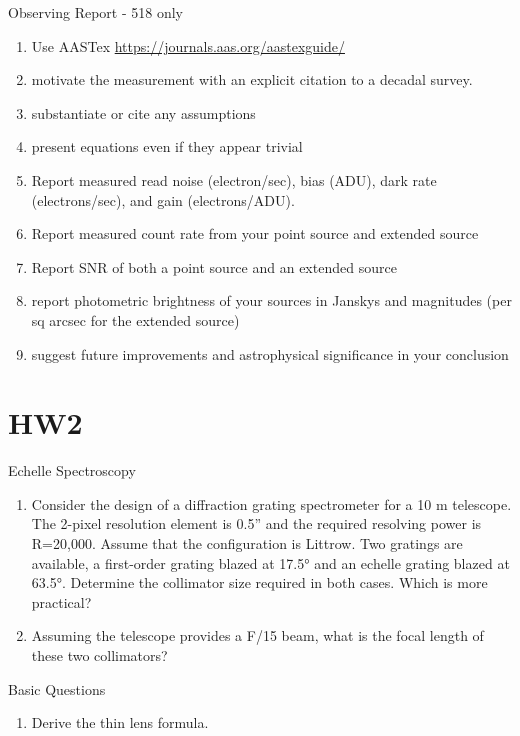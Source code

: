 \begin{frame}{Observing Report - 518 only}
 \begin{enumerate}
 \item Use AASTex \url{https://journals.aas.org/aastexguide/} 
 \item motivate the measurement with an explicit citation to a decadal survey.
 \item substantiate or cite any assumptions
 \item present equations even if they appear trivial
\item Report measured read noise (electron/sec), bias (ADU), dark rate (electrons/sec), and gain (electrons/ADU).
\item Report measured count rate from your point source and extended source
\item Report SNR of both a point source and an extended source
\item report photometric brightness of your sources in Janskys and magnitudes (per sq arcsec for the extended source)
\item suggest future improvements and astrophysical significance in your conclusion
\end{enumerate}
\end{frame}


\section{HW2}

\begin{frame}{Echelle Spectroscopy}

 \begin{enumerate}
 \item Consider the design of a diffraction grating spectrometer for a 10 m telescope. The 2-pixel resolution
element is 0.5” and the required resolving power is R=20,000. Assume that the configuration is Littrow.
Two gratings are available, a first-order grating blazed at 17.5° and an echelle grating blazed at 63.5°.
Determine the collimator size required in both cases. Which is more practical?
\item Assuming the telescope
provides a F/15 beam, what is the focal length of these two collimators?
\end{enumerate}
\end{frame}


\begin{frame}{Basic Questions}
 \begin{enumerate}
 \item Derive the thin lens formula.
\end{enumerate}

\end{frame}


